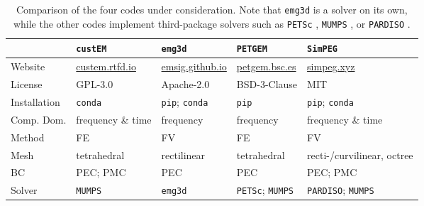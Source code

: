 \documentclass[extra, camera,%
]{gji}
\newcommand{\emg}[2]{\texttt{emg#1#2}\xspace}
\newcommand{\simpeg}{\texttt{SimPEG}\xspace}
\newcommand{\custem}{\texttt{custEM}\xspace}
\newcommand{\petgem}{\texttt{PETGEM}\xspace}
\begin{document}
%
\begin{table}
\begin{minipage}{.9\linewidth}
  \centering
  \caption{Comparison of the four codes under consideration. Note that \emg3d is a solver on its own, while the other codes implement third-package solvers such as \texttt{PETSc} \citep{Preprint.Abhyankar}, \texttt{MUMPS} \citep{SIAM.01.Amestoy}, or \texttt{PARDISO} \citep{FGCS.04.Schenk}.}
\label{tbl:codecomparison}
  \begin{tabularx}{\linewidth}{lXXXX}
  \toprule
  & \custem & \emg3d & \petgem & \simpeg  \\
  \midrule
  Website & \href{https://custem.rtfd.io}{custem.rtfd.io}
          & \href{https://emsig.github.io}{emsig.github.io}
          & \href{http://petgem.bsc.es}{petgem.bsc.es}
          & \href{https://docs.simpeg.xyz}{simpeg.xyz} \\
  License & GPL-3.0 & Apache-2.0 & BSD-3-Clause & MIT \\
  Installation & \texttt{conda}
               & \texttt{pip}; \texttt{conda}
               & \texttt{pip}
               & \texttt{pip}; \texttt{conda} \\
  Comp. Dom. & frequency \& time & frequency & frequency & frequency \& time \\
  Method & FE & FV & FE & FV \\
  Mesh & tetrahedral & rectilinear & tetrahedral & recti-/curvilinear, octree \\
  BC & PEC; PMC & PEC & PEC & PEC; PMC \\
  Solver & \texttt{MUMPS} & \emg3d & \texttt{PETSc}; \texttt{MUMPS} &
           \texttt{PARDISO}; \texttt{MUMPS} \\
  \bottomrule
\end{tabularx}
\end{minipage}
\end{table}
%
\end{document}
